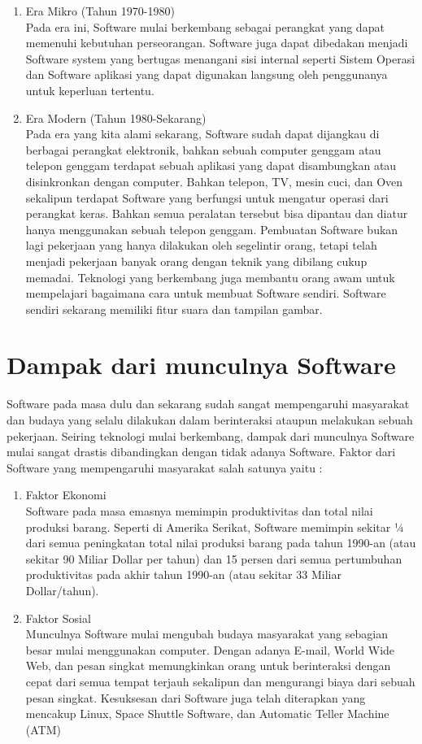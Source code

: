 \begin{flushleft}
\begin{enumerate}
	\item Era Mikro (Tahun 1970-1980) \\
Pada era ini, Software mulai berkembang sebagai perangkat yang dapat memenuhi kebutuhan perseorangan. Software juga dapat dibedakan menjadi Software system yang bertugas menangani sisi internal seperti Sistem Operasi dan Software aplikasi yang dapat digunakan langsung oleh penggunanya untuk keperluan tertentu. 
	\item Era Modern (Tahun 1980-Sekarang) \\
Pada era yang kita alami sekarang, Software sudah dapat dijangkau di berbagai perangkat elektronik, bahkan sebuah computer genggam atau telepon genggam terdapat sebuah aplikasi yang dapat disambungkan atau disinkronkan dengan computer. Bahkan telepon, TV, mesin cuci, dan Oven sekalipun terdapat Software yang berfungsi untuk mengatur operasi dari perangkat keras. Bahkan semua peralatan tersebut bisa dipantau dan diatur hanya menggunakan sebuah telepon genggam. Pembuatan Software bukan lagi pekerjaan yang hanya dilakukan oleh segelintir orang, tetapi telah menjadi pekerjaan banyak orang dengan teknik yang dibilang cukup memadai. Teknologi yang berkembang juga membantu orang awam untuk mempelajari bagaimana cara untuk membuat Software sendiri. Software sendiri sekarang memiliki fitur suara dan tampilan gambar.
\end{enumerate}
\end{flushleft}
\section{Dampak dari munculnya Software}
\begin{flushleft}
Software pada masa dulu dan sekarang sudah sangat mempengaruhi masyarakat dan budaya yang selalu dilakukan dalam berinteraksi ataupun melakukan sebuah pekerjaan. Seiring teknologi mulai berkembang, dampak dari munculnya Software mulai sangat drastis dibandingkan dengan tidak adanya Software. Faktor dari Software yang mempengaruhi masyarakat salah satunya yaitu : 
\begin{enumerate}
	\item Faktor Ekonomi\\
	Software pada masa emasnya memimpin produktivitas dan total nilai produksi barang. Seperti di Amerika Serikat, Software memimpin sekitar ¼ dari semua peningkatan total nilai produksi barang pada tahun 1990-an (atau sekitar 90 Miliar Dollar per tahun) dan 15 persen dari semua pertumbuhan produktivitas pada akhir tahun 1990-an (atau sekitar 33  Miliar Dollar/tahun).
	\item Faktor Sosial\\
Munculnya Software mulai mengubah budaya masyarakat yang sebagian besar mulai menggunakan computer. Dengan adanya E-mail, World Wide Web, dan pesan singkat memungkinkan orang untuk berinteraksi dengan cepat dari semua tempat terjauh sekalipun dan mengurangi biaya dari sebuah pesan singkat. 
Kesuksesan dari Software juga telah diterapkan yang mencakup Linux, Space Shuttle Software, dan Automatic Teller Machine (ATM)	
\end{enumerate}
\end{flushleft}
